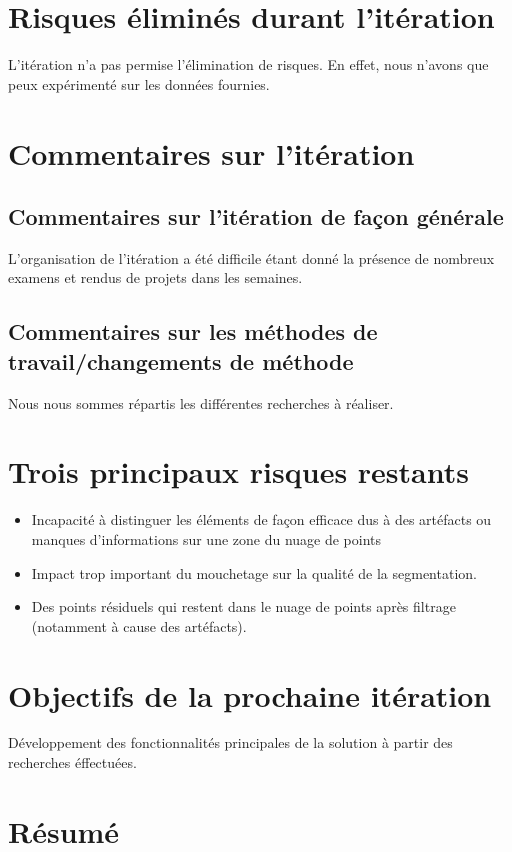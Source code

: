 \documentclass[12pt,titlepage,french]{article}
\begin{document}
\section{Risques éliminés durant l'itération}
L'itération n'a pas permise l'élimination de risques. En effet, nous n'avons que peux expérimenté sur les données fournies.

\section{Commentaires sur l'itération}

\subsection{Commentaires sur l'itération de façon générale}
L'organisation de l'itération a été difficile étant donné la présence de nombreux examens et rendus de projets dans les semaines.

\subsection{Commentaires sur les méthodes de travail/changements de méthode}
Nous nous sommes répartis les différentes recherches à réaliser. 

\section{Trois principaux risques restants}
\begin{itemize}
  \item Incapacité à distinguer les éléments de façon efficace dus à des artéfacts ou manques d'informations sur une zone du nuage de points
  \item Impact trop important du mouchetage sur la qualité de la segmentation.
  \item Des points résiduels qui restent dans le nuage de points après filtrage (notamment à cause des artéfacts).  
\end{itemize}

\section{Objectifs de la prochaine itération}
Développement des fonctionnalités principales de la solution à partir des recherches éffectuées.

\section{Résumé}
\end{document}
